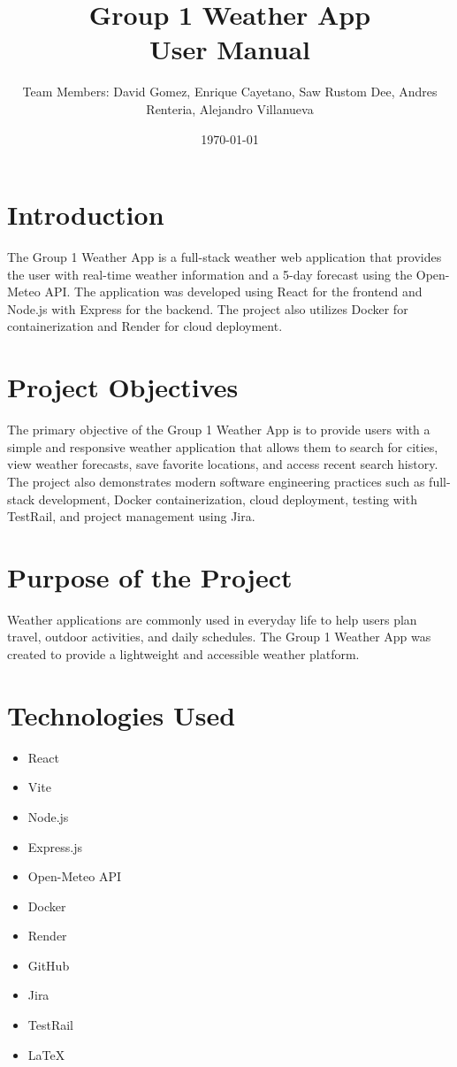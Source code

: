 \documentclass[12pt]{article}
\title{Group 1 Weather App\\User Manual}
\author{Team Members: David Gomez, Enrique Cayetano, Saw Rustom Dee, Andres Renteria, Alejandro Villanueva}
\date{\today}
\begin{document}
\maketitle

\tableofcontents

\newpage

\section{Introduction}

The Group 1 Weather App is a full-stack weather web application that provides the user with real-time weather information and a 5-day forecast using the Open-Meteo API. The application was developed using React for the frontend and Node.js with Express for the backend. The project also utilizes Docker for containerization and Render for cloud deployment.

\section{Project Objectives}

The primary objective of the Group 1 Weather App is to provide users with a simple and responsive weather application that allows them to search for cities, view weather forecasts, save favorite locations, and access recent search history. The project also demonstrates modern software engineering practices such as full-stack development, Docker containerization, cloud deployment, testing with TestRail, and project management using Jira.

\section{Purpose of the Project}

Weather applications are commonly used in everyday life to help users plan travel, outdoor activities, and daily schedules. The Group 1 Weather App was created to provide a lightweight and accessible weather platform.

\section{Technologies Used}

\begin{itemize}
    \item React
    \item Vite
    \item Node.js
    \item Express.js
    \item Open-Meteo API
    \item Docker
    \item Render
    \item GitHub
    \item Jira
    \item TestRail
    \item LaTeX
\end{itemize}
\end{document}
